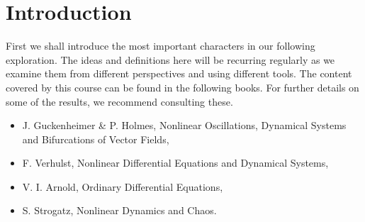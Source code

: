 \chapter{Introduction}
First we shall introduce the most important characters in our following exploration. The ideas and definitions here will be recurring regularly as we examine them from different perspectives and using different tools. The content covered by this course can be found in the following books. For further details on some of the results, we recommend consulting these.
\begin{itemize}
	\item J. Guckenheimer \& P. Holmes, Nonlinear Oscillations, Dynamical Systems and Bifurcations of Vector Fields,
	\item F. Verhulst, Nonlinear Differential Equations and Dynamical Systems,
	\item V. I. Arnold, Ordinary Differential Equations,
	\item S. Strogatz, Nonlinear Dynamics and Chaos.
\end{itemize}


